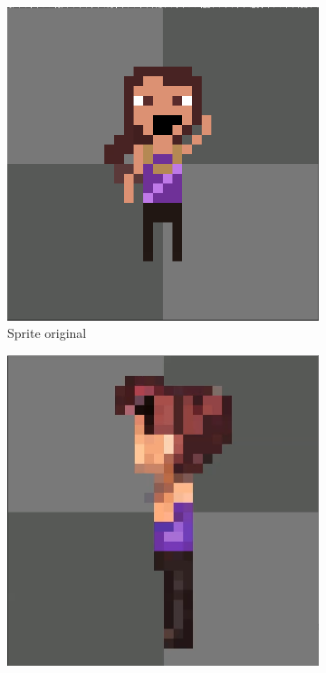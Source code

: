 \begin{figure}[htbp]
    \begin{subfigure}{0.32\linewidth}
        \includegraphics[width=1\linewidth]{figs/pixelLab/dia4/irma.PNG}
        \caption{\small Sprite original}
        \label{fig:pixelLabAnimaComparaRodarSprite}
    \end{subfigure}
    \begin{subfigure}{0.32\linewidth}
        \includegraphics[width=1\linewidth]{figs/pixelLab/dia4/printA.PNG}

\end{subfigure}
\end{figure}
